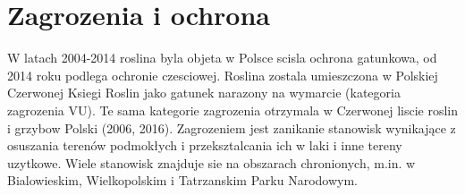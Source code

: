 \documentclass{beamer}
\begin{document}
\section{Zagrozenia i ochrona}
\begin{frame}
W latach 2004-2014 roslina byla objeta w Polsce scisla ochrona gatunkowa, od 2014 roku podlega ochronie czesciowej. Roslina zostala umieszczona w Polskiej Czerwonej Ksiegi Roslin jako gatunek narazony na wymarcie (kategoria zagrozenia VU). Te sama kategorie zagrozenia otrzymala w Czerwonej liscie roslin i grzybow Polski (2006, 2016). Zagrozeniem jest zanikanie stanowisk wynikające z osuszania terenów podmokłych i przeksztalcania ich w laki i inne tereny uzytkowe. Wiele stanowisk znajduje sie na obszarach chronionych, m.in. w Bialowieskim, Wielkopolskim i Tatrzanskim Parku Narodowym.
\end{frame}
\end{document}
